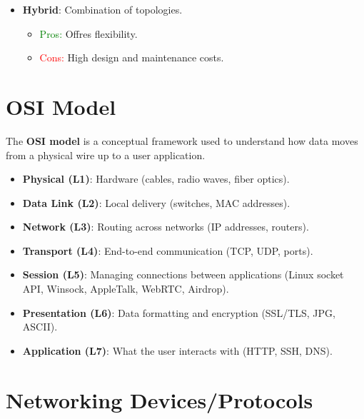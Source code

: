 \documentclass[12pt, letterpaper]{article}
\begin{document}
\begin{itemize}
        \begin{itemize}
            \item \textcolor{green}{Pros:} Scalable.
            \item \textcolor{red}{Cons:} Central hub failure impacts the entire network.
        \end{itemize}
    \item \textbf{Hybrid}: Combination of topologies.
        \begin{itemize}
            \item \textcolor{green}{Pros:} Offres flexibility.
            \item \textcolor{red}{Cons:} High design and maintenance costs.
        \end{itemize}
\end{itemize}

\section*{OSI Model}

The \textbf{OSI model} is a conceptual framework used to understand how data moves from a physical wire up to a user application.

\begin{itemize}
    \item \textbf{Physical (L1)}: Hardware (cables, radio waves, fiber optics).
    \item \textbf{Data Link (L2)}: Local delivery (switches, MAC addresses).
    \item \textbf{Network (L3)}: Routing across networks (IP addresses, routers).
    \item \textbf{Transport (L4)}: End-to-end communication (TCP, UDP, ports).
    \item \textbf{Session (L5)}: Managing connections between applications (Linux socket API, Winsock, AppleTalk, WebRTC, Airdrop).
    \item \textbf{Presentation (L6)}: Data formatting and encryption (SSL/TLS, JPG, ASCII).
    \item \textbf{Application (L7)}: What the user interacts with (HTTP, SSH, DNS).

\end{itemize}

\section*{Networking Devices/Protocols}
\end{document}
